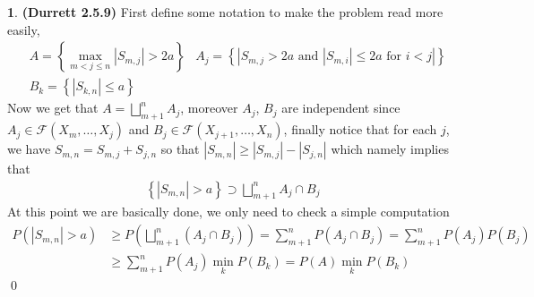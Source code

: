 \documentclass{article}
\theoremstyle{definition}
\newtheorem{pb}{}
\newcommand{\set}[1]{\left\{#1\right\}}
\newcommand{\abs}[1]{\left\vert#1\right\vert}
\newcommand{\tand}{\text{ and }}
\begin{document}
    \begin{pb}\textbf{(Durrett 2.5.9)}
        First define some notation to make the problem read more easily, 
        \begin{align*}
            &A = \set{\max_{m<j\leq n}\abs{S_{m,j}} > 2a} &A_j = \set{\abs{S_{m,j} > 2a \tand \abs{S_{m,i}} \leq 2a \text{ for }i<j}} \\
            &B_k = \set{\abs{S_{k,n}} \leq a}
        \end{align*}
        Now we get that \(A = \bigsqcup_{m+1}^n A_j\), moreover \(A_j\), \(B_j\) are independent since \(A_j \in \mathcal{F}(X_m,\hdots,X_j)\) and \(B_j \in \mathcal{F}(X_{j+1},\hdots,X_n)\), finally notice that for each \(j\), we have \(S_{m,n} = S_{m,j} + S_{j,n}\) so that \(\abs{S_{m,n}} \geq \abs{S_{m,j}} - \abs{S_{j,n}}\) which namely implies that
        \begin{align*}
            \set{\abs{S_{m,n}} > a} \supset \bigsqcup_{m+1}^n A_j\cap B_j
        \end{align*}
        At this point we are basically done, we only need to check a simple computation
        \begin{align*}
            P(\abs{S_{m,n}} > a) &\geq P(\bigsqcup_{m+1}^n (A_j \cap B_j)) = \sum_{m+1}^n P(A_j \cap B_j) = \sum_{m+1}^n P(A_j)P(B_j) \\
            &\geq \sum_{m+1}^n P(A_j)\min_kP(B_k) = P(A)\min_kP(B_k)
        \end{align*} \qed
    \end{pb}
\end{document}
